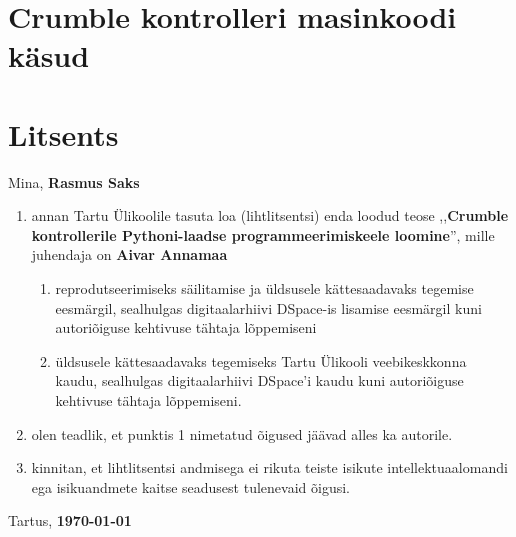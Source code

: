 \documentclass[12pt]{article}
\begin{document}
\section{Crumble kontrolleri masinkoodi käsud} \label{masinkoodi-käsud}
\newpage
\section{Litsents}
Mina, \textbf{Rasmus Saks}
\begin{enumerate}
	\item annan Tartu Ülikoolile tasuta loa (lihtlitsentsi) enda loodud teose ,,\textbf{Crumble kontrollerile Pythoni-laadse programmeerimiskeele loomine}'', mille juhendaja on \textbf{Aivar Annamaa}
	\begin{enumerate}[label*=\arabic*.]
		\item reprodutseerimiseks säilitamise ja üldsusele kättesaadavaks tegemise eesmärgil, sealhulgas digitaalarhiivi DSpace-is lisamise eesmärgil kuni autoriõiguse kehtivuse tähtaja lõppemiseni
		\item üldsusele kättesaadavaks tegemiseks Tartu Ülikooli veebikeskkonna kaudu, sealhulgas digitaalarhiivi DSpace'i kaudu kuni autoriõiguse kehtivuse tähtaja lõppemiseni.
	\end{enumerate}
	\item olen teadlik, et punktis 1 nimetatud õigused jäävad alles ka autorile.
	\item kinnitan, et lihtlitsentsi andmisega ei rikuta teiste isikute intellektuaalomandi ega isikuandmete kaitse seadusest tulenevaid õigusi.
\end{enumerate}


Tartus, \textbf{\today}
\newpage
\end{document}

